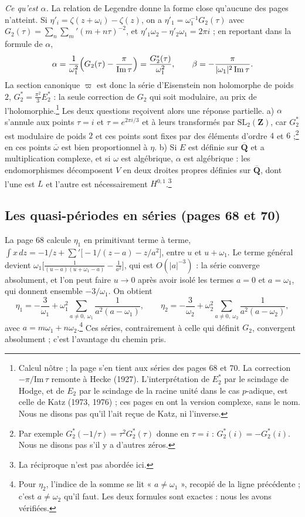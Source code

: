 \documentclass[11pt,a4paper]{article}
\begin{document}
\emph{Ce qu'est $\alpha$.} La relation de Legendre donne la forme close
qu'aucune des pages n'atteint. Si $\eta'_i = \zeta(z+\omega_i) - \zeta(z)$,
on a $\eta'_1 = \omega_1^{-1}G_2(\tau)$ avec $G_2(\tau) = \sum_n
\sum_{m}{}' (m+n\tau)^{-2}$, et $\eta'_1\omega_2 - \eta'_2\omega_1 = 2\pi i$ ;
en reportant dans la formule de $\alpha$,
\[
\alpha = \frac{1}{\omega_1^2}\Bigl(G_2(\tau) - \frac{\pi}{\mathrm{Im}\,\tau}\Bigr)
= \frac{G_2^*(\tau)}{\omega_1^2},
\qquad
\beta = -\frac{\pi}{|\omega_1|^2\,\mathrm{Im}\,\tau}.
\]
La section canonique $\varpi$ est donc la série d'Eisenstein non holomorphe de
poids $2$, $G_2^* = \tfrac{\pi^2}{3}E_2^*$ : la seule correction de $G_2$ qui
soit modulaire, au prix de l'holomorphie.\footnote{Calcul nôtre ; la page
s'en tient aux séries des pages 68 et 70. La correction $-\pi/\mathrm{Im}\,\tau$
remonte à Hecke (1927). L'interprétation de $E_2^*$ par le scindage de Hodge,
et de $E_2$ par le scindage de la racine unité dans le cas $p$-adique, est
celle de Katz (1973, 1976) ; ces pages en ont la version complexe, sans le
nom. Nous ne disons pas qu'il l'ait reçue de Katz, ni l'inverse.} Les deux
questions reçoivent alors une réponse partielle. a) $\alpha$ s'annule aux
points $\tau = i$ et $\tau = e^{2\pi i/3}$ et à leurs transformés par
$\mathrm{SL}_2(\mathbf{Z})$, car $G_2^*$ est modulaire de poids $2$ et ces
points sont fixes par des éléments d'ordre $4$ et $6$ ;\footnote{Par exemple
$G_2^*(-1/\tau) = \tau^2G_2^*(\tau)$ donne en $\tau = i$ : $G_2^*(i) =
-G_2^*(i)$. Nous ne disons pas s'il y a d'autres zéros.} en ces points
$\bar\omega$ est bien proportionnel à $\eta$. b) Si $E$ est définie sur
$\overline{\mathbf{Q}}$ et a multiplication complexe, et si $\omega$ est
algébrique, $\alpha$ est algébrique : les endomorphismes décomposent $V$ en
deux droites propres définies sur $\overline{\mathbf{Q}}$, dont l'une est $L$
et l'autre est nécessairement $H^{0,1}$.\footnote{La réciproque n'est pas
abordée ici.}

\subsection*{Les quasi-périodes en séries (pages 68 et 70)}

La page 68 calcule $\eta_1$ en primitivant terme à terme, $\int x\,dz = -1/z
+ \sum'\bigl[-1/(z-a) - z/a^2\bigr]$, entre $u$ et $u+\omega_1$. Le terme
général devient $\omega_1\bigl[\tfrac{1}{(u-a)(u+\omega_1-a)} -
\tfrac{1}{a^2}\bigr]$, qui est $O(|a|^{-3})$ : la série converge absolument,
et l'on peut faire $u \to 0$ après avoir isolé les termes $a = 0$ et $a =
\omega_1$, qui donnent ensemble $-3/\omega_1$. On obtient
\[
\eta_1 = -\frac{3}{\omega_1} + \omega_1^2
\sum_{a\neq 0,\ \omega_1}\frac{1}{a^2(a-\omega_1)}, \qquad
\eta_2 = -\frac{3}{\omega_2} + \omega_2^2
\sum_{a\neq 0,\ \omega_2}\frac{1}{a^2(a-\omega_2)},
\]
avec $a = m\omega_1 + n\omega_2$.\footnote{Pour $\eta_2$, l'indice de la
somme se lit « $a \neq \omega_1$ », recopié de la ligne précédente ; c'est
$a \neq \omega_2$ qu'il faut. Les deux formules sont exactes : nous les avons
vérifiées.} Ces séries, contrairement à celle qui définit $G_2$, convergent
absolument ; c'est l'avantage du chemin pris.
\end{document}
